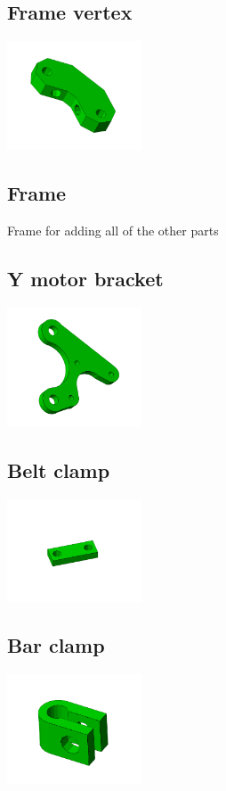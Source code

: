 \documentclass[11pt]{article}
\begin{document}
\subsection{Frame vertex}


\includegraphics[width=4cm]{images/frame-vertex.jpg}
\subsection{Frame}
Frame for adding all of the other parts

\subsection{Y motor bracket}


\includegraphics[width=4cm]{images/y-motor-bracket.jpg}
\subsection{Belt clamp}


\includegraphics[width=4cm]{images/belt-clamp.jpg}
\subsection{Bar clamp}


\includegraphics[width=4cm]{images/bar-clamp.jpg}
\end{document}
